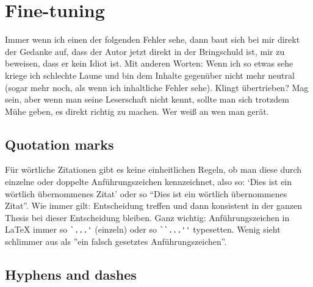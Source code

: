 \section{Fine-tuning}
Immer wenn ich einen der folgenden Fehler sehe, dann baut sich bei mir direkt der Gedanke auf, dass der Autor jetzt direkt in der Bringschuld ist, mir zu beweisen, dass er kein Idiot ist. Mit anderen Worten: Wenn ich so etwas sehe kriege ich schlechte Laune und bin dem Inhalte gegenüber nicht mehr neutral (sogar mehr noch, als wenn ich inhaltliche Fehler sehe). Klingt übertrieben? Mag sein, aber wenn man seine Leserschaft nicht kennt, sollte man sich trotzdem Mühe geben, es direkt richtig zu machen. Wer weiß an wen man gerät.
\subsection{Quotation marks}
Für wörtliche Zitationen gibt es keine einheitlichen Regeln, ob man diese durch einzelne oder doppelte Anführungszeichen kennzeichnet, also so: `Dies ist ein wörtlich übernommenes Zitat' oder so ``Dies ist ein wörtlich übernommenes Zitat''. Wie immer gilt: Entscheidung treffen und dann konsistent in der ganzen Thesis bei dieser Entscheidung bleiben. Ganz wichtig: Anführungszeichen in LaTeX immer so \verb|`...'| (einzeln) oder so \verb|``...''| typesetten. Wenig sieht schlimmer aus als ''ein falsch gesetztes Anführungszeichen''.

\subsection{Hyphens and dashes}

